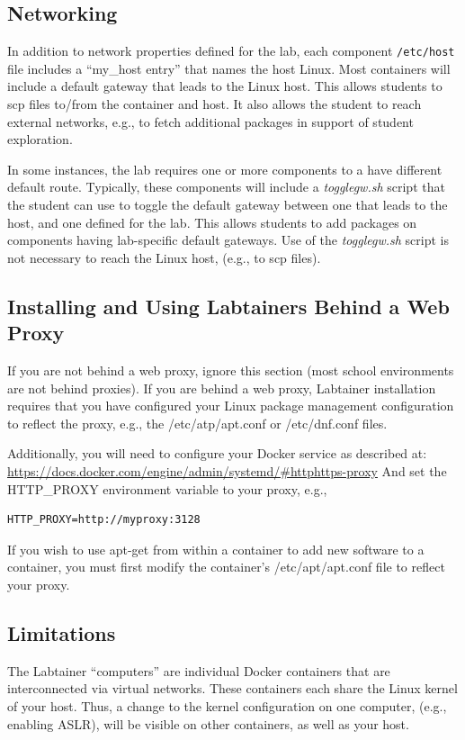 \documentclass[12pt]{article}
\begin{document}
\subsection{Networking}
In addition to network properties defined for the lab,
each component \texttt{/etc/host} file includes a ``my\_host entry'' that names
the host Linux.  Most containers will include a default gateway that
leads to the Linux host.  This allows students to scp files to/from the container and host.
It also allows the student to reach external networks, e.g., to fetch additional packages in
support of student exploration.

In some instances, the lab requires one or more components to a have different default route.
Typically, these components will include a \textit{togglegw.sh} script that the student
can use to toggle the default gateway between one that leads to the host, and one defined for the lab.
This allows students to add packages on components having lab-specific default gateways.
Use of the \textit{togglegw.sh} script is not necessary to reach the Linux host, (e.g., to scp files).

\subsection{Installing and Using Labtainers Behind a Web Proxy}
If you are not behind a web proxy, ignore this section (most school environments
are not behind proxies). 
If you are behind a web proxy, Labtainer installation
requires that you have configured your Linux package management configuration to reflect
the proxy, e.g., the /etc/atp/apt.conf or /etc/dnf.conf files.  

Additionally, you will need to configure your Docker service as described at:
\url{https://docs.docker.com/engine/admin/systemd/#httphttps-proxy}
And set the HTTP\_PROXY environment variable to your proxy, e.g., 
\begin{verbatim}
HTTP_PROXY=http://myproxy:3128
\end{verbatim}
If you wish to use apt-get from within a container to add new software to a container, you
must first modify the container's /etc/apt/apt.conf file to reflect your proxy.

\subsection{Limitations}
The Labtainer ``computers'' are individual Docker containers that are interconnected via virtual
networks.  These containers each share the Linux kernel of your host.  Thus, a change
to the kernel configuration on one computer, (e.g., enabling ASLR), will be visible on
other containers, as well as your host.
\end{document}

